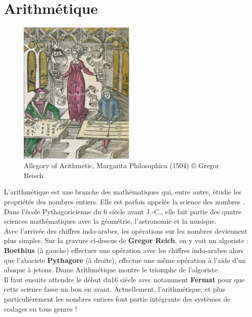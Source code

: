 \chapter{Arithmétique} \label{N4}

\vfill

\begin{figure}[h]
   \centering
      \includegraphics[height=7cm]{Nombres_et_calculs/Images/N4_intro_arithmeticae}
   \caption{Allegory of Arithmetic, Margarita Philosophica (1504) © Gregor Reisch}
\end{figure}

\vfill

\begin{prerequis}
   L'arithmétique est une branche des mathématiques qui, entre autre, étudie les propriétés des nombres entiers. Elle est parfois appelée \og la science des nombres \fg. Dans l'école Pythagoricienne du 6 siècle avant J.-C., elle fait partie des quatre sciences mathématiques avec la géométrie, l'astronomie et la musique. \\
   Avec l'arrivée des chiffres indo-arabes, les opérations sur les nombres deviennent plus simples. Sur la gravure ci-dessus de {\bf Gregor Reich}, on y voit un algoriste : {\bf Boethius} (à gauche) effectuer une opération avec les chiffres indo-arabes alors que l'abaciste {\bf Pythagore} (à droite), effectue une même opération à l'aide d'un abaque à jetons. Dame Arithmétique montre le triomphe de l'algoriste. \\
   Il faut ensuite attendre le début du16 siècle avec notamment {\bf Fermat} pour que cette science fasse un bon en avant. Actuellement, l'arithmétique, et plus particulièrement les nombres entiers font partie intégrante des systèmes de codages en tous genres !
\end{prerequis}


